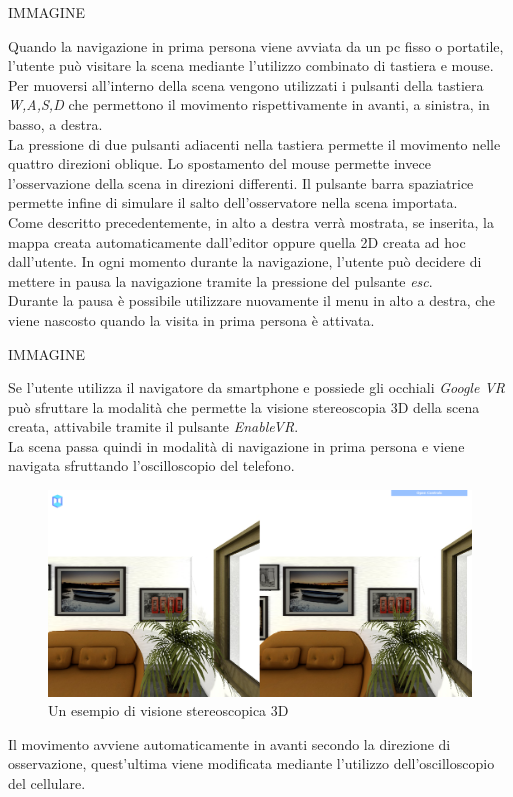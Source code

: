 IMMAGINE


Quando la navigazione in prima persona viene avviata da un pc fisso o portatile,  l’utente può visitare la scena mediante l’utilizzo combinato di tastiera e mouse.
Per muoversi all’interno della scena vengono utilizzati i pulsanti della tastiera \emph{W,A,S,D} che permettono il movimento rispettivamente in avanti, a sinistra, in basso, a destra.
\\ 
La pressione di due pulsanti adiacenti nella tastiera permette il movimento nelle quattro direzioni oblique. Lo spostamento del mouse permette invece l’osservazione della scena in direzioni differenti.
Il pulsante barra spaziatrice permette infine di simulare il salto dell’osservatore nella scena importata.
\\
Come descritto precedentemente, in alto a destra verrà mostrata, se inserita, la mappa creata automaticamente dall’editor oppure quella 2D creata ad hoc dall’utente.
In ogni momento durante la navigazione, l’utente può decidere di mettere in pausa la navigazione tramite la pressione del pulsante \emph{esc}.
\\
Durante la pausa è possibile utilizzare nuovamente il menu in alto a destra, che viene nascosto quando la visita in prima persona è attivata.

IMMAGINE


Se l’utente utilizza il navigatore da smartphone e possiede gli occhiali \emph{Google VR}  può sfruttare la modalità che permette la visione stereoscopia 3D della scena creata, attivabile tramite il pulsante \emph{EnableVR}.
\\
La scena passa quindi in modalità di navigazione in prima persona e viene navigata sfruttando l’oscilloscopio del telefono.
\\
\begin{figure}[htb]
 \centering
 \includegraphics[width=1\linewidth]{images/chapter_caso_uso/google_vr.png}\hfill
 \caption[Esempio di visione stereoscopica 3D]{Un esempio di visione stereoscopica 3D}
 \label{fig:caso_uso_vista_alto}
\end{figure}

Il movimento avviene automaticamente in avanti secondo la direzione di osservazione, quest’ultima viene modificata mediante l’utilizzo dell’oscilloscopio del cellulare.


